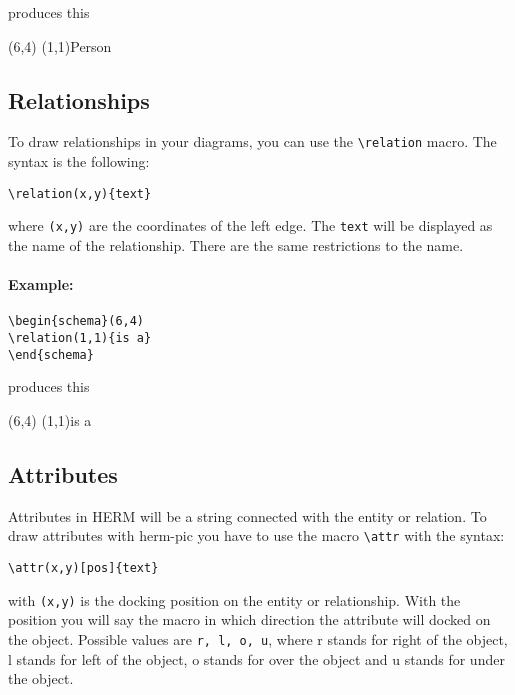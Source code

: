 \documentclass[a4paper,11pt]{article}
\begin{document}
produces this

\begin{schema}(6,4)
\entity(1,1){Person}
\end{schema}

\subsection{Relationships}

To draw relationships in your diagrams, you can use the \verb|\relation| macro.
The syntax is the following:

\begin{verbatim}
\relation(x,y){text}
\end{verbatim}

where {\tt (x,y)} are the coordinates of the left edge. The {\tt text} will be displayed as 
the name of the relationship. There are the same restrictions to the name.

\paragraph{Example:}

\begin{verbatim}
\begin{schema}(6,4)
\relation(1,1){is a}
\end{schema}
\end{verbatim}

produces this

\begin{schema}(6,4)
\relation(1,1){is a}
\end{schema}

\subsection{Attributes}

Attributes in HERM will be a string connected with the entity or relation.
To draw attributes with herm-pic you have to use the macro \verb|\attr| with the syntax:

\begin{verbatim}
\attr(x,y)[pos]{text}
\end{verbatim}

with {\tt (x,y)} is the docking position on the entity or relationship. With the
position you will say the macro in which direction the attribute will docked on
the object. Possible values are {\tt r, l, o, u}, where r stands for right of the object,
l stands for left of the object, o stands for over the object and u stands for under the object.
\end{document}
